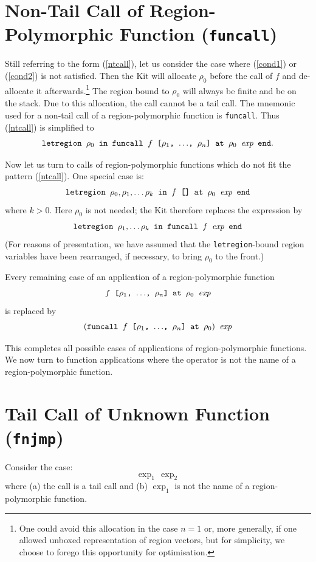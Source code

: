 \documentclass[12pt]{book}
\begin{document}
\section{Non-Tail Call of Region-Polymorphic Function ({\tt funcall})}
Still referring to the form (\ref{ntcall}), let us consider the
case where (\ref{cond1}) or (\ref{cond2}) is not satisfied.
Then the Kit will allocate $\rho_0$ before the call of $f$ 
and de-allocate it afterwards.\footnote{One could avoid this
allocation in the case $n=1$ or, more generally, if one
allowed unboxed representation of region vectors, but for
simplicity, we choose to forego this opportunity for optimisation.} 
The region bound to 
$\rho_0$ will always be finite and be on the stack. 
Due to this allocation, the call cannot be a tail call. The
mnemonic used for a non-tail call of a region-polymorphic function
is {\tt funcall}. Thus (\ref{ntcall}) is simplified to 
$$\hbox{\tt letregion $\rho_0$ in funcall $f$ [$\rho_1$, $\ldots$, $\rho_n$] at $\rho_0$ $\hbox{\it exp}$ end}.$$


Now let us turn to calls of region-polymorphic functions which do not fit the
pattern (\ref{ntcall}). One special case is:
$$\hbox{\tt letregion $\rho_0,\rho_1,\ldots\rho_k$ in $f$ [] at $\rho_0$ $\hbox{\it exp}$ end}
$$
where  $k>0$. Here $\rho_0$ is not needed; the Kit therefore replaces
the expression by 
$$\hbox{\tt letregion $\rho_1,\ldots\rho_k$ in funcall $f$  $\hbox{\it exp}$ end}
$$
(For reasons of presentation, we have assumed that the
\texttt{letregion}-bound region variables have been rearranged, if
necessary, to bring $\rho_0$ to the front.)

Every remaining case of an application of a region-polymorphic function
       $$\hbox{\tt $f$ [$\rho_1$, $\ldots$, $\rho_n$] at $\rho_0$ $\hbox{\it exp}$}$$
is replaced by 
       $$\hbox{\tt $($funcall $f$ [$\rho_1$, $\ldots$, $\rho_n$] at $\rho_0)$ $\hbox{\it exp}$}$$

This completes all possible cases of applications of 
region-polymorphic functions. We now turn to function applications
where the operator is not the name of a region-polymorphic function.

\section{Tail Call of Unknown Function ({\tt fnjmp})}
Consider the case:
$$\exp_1\,\exp_2$$
where (a) the call is a tail call and (b) $\exp_1$ is not the name of a region-polymorphic function.
\end{document}
